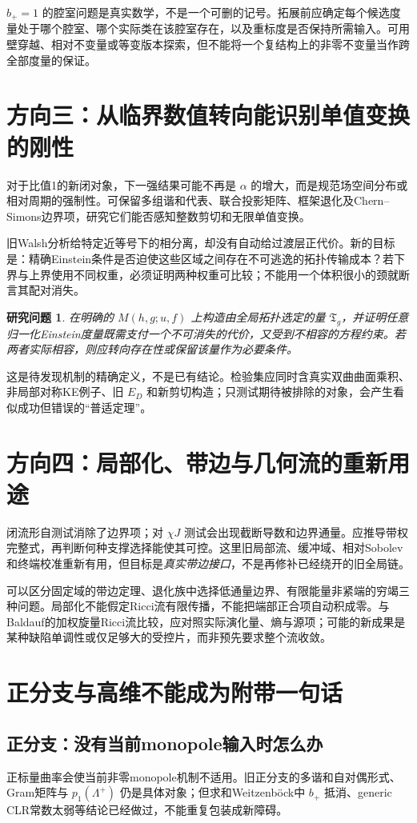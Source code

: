 \documentclass[UTF8,fontset=fandol,zihao=-4]{ctexart}
\theoremstyle{research}
\newtheorem{target}[sourceprop]{研究问题}
\begin{document}
$b_+=1$ 的腔室问题是真实数学，不是一个可删的记号。拓展前应确定每个候选度量处于哪个腔室、哪个实际类在该腔室存在，以及重标度是否保持所需输入。可用壁穿越、相对不变量或等变版本探索，但不能将一个复结构上的非零不变量当作跨全部度量的保证。

\section{方向三：从临界数值转向能识别单值变换的刚性}
对于比值1的新闭对象，下一强结果可能不再是 $\alpha$ 的增大，而是规范场空间分布或相对周期的强制性。可保留多组谐和代表、联合投影矩阵、框架退化及Chern--Simons边界项，研究它们能否感知整数剪切和无限单值变换。

旧Walsh分析给特定近等号下的相分离，却没有自动给过渡层正代价。新的目标是：精确Einstein条件是否迫使这些区域之间存在不可逃逸的拓扑传输成本？若下界与上界使用不同权重，必须证明两种权重可比较；不能用一个体积很小的颈就断言其配对消失。

\begin{target}
在明确的 $M(h,g;u,f)$ 上构造由全局拓扑选定的量 $\mathfrak T_g$，并证明任意归一化Einstein度量既需支付一个不可消失的代价，又受到不相容的方程约束。若两者实际相容，则应转向存在性或保留该量作为必要条件。
\end{target}
这是待发现机制的精确定义，不是已有结论。检验集应同时含真实双曲曲面乘积、非局部对称KE例子、旧 $E_D$ 和新剪切构造；只测试期待被排除的对象，会产生看似成功但错误的“普适定理”。

\section{方向四：局部化、带边与几何流的重新用途}
闭流形自测试消除了边界项；对 $\chi J$ 测试会出现截断导数和边界通量。应推导带权完整式，再判断何种支撑选择能使其可控。这里旧局部流、缓冲域、相对Sobolev和终端校准重新有用，但目标是\emph{真实带边接口}，不是再修补已经绕开的旧全局链。

可以区分固定域的带边定理、退化族中选择低通量边界、有限能量非紧端的穷竭三种问题。局部化不能假定Ricci流有限传播，不能把端部正合项自动积成零。与Baldauf的加权旋量Ricci流\cite{Baldauf}比较，应对照实际演化量、熵与源项；可能的新成果是某种缺陷单调性或仅足够大的受控片，而非预先要求整个流收敛。

\section{正分支与高维不能成为附带一句话}
\subsection{正分支：没有当前monopole输入时怎么办}
正标量曲率会使当前非零monopole机制不适用。旧正分支的多谐和自对偶形式、Gram矩阵与 $p_1(\Lambda^+)$ 仍是具体对象；但求和Weitzenböck中 $b_+$ 抵消、generic CLR常数太弱等结论已经做过，不能重复包装成新障碍。
\end{document}
